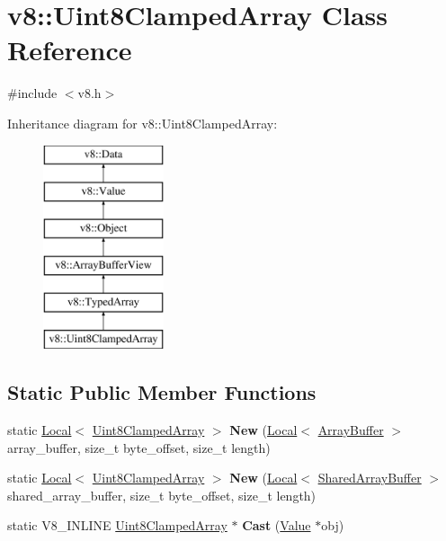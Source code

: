 \hypertarget{classv8_1_1_uint8_clamped_array}{}\section{v8\+:\+:Uint8\+Clamped\+Array Class Reference}
\label{classv8_1_1_uint8_clamped_array}


{\ttfamily \#include $<$v8.\+h$>$}

Inheritance diagram for v8\+:\+:Uint8\+Clamped\+Array\+:\begin{figure}[H]
\begin{center}
\leavevmode
\includegraphics[height=6.000000cm]{classv8_1_1_uint8_clamped_array}
\end{center}
\end{figure}
\subsection*{Static Public Member Functions}
\begin{DoxyCompactItemize}
\item 
static \hyperlink{classv8_1_1_local}{Local}$<$ \hyperlink{classv8_1_1_uint8_clamped_array}{Uint8\+Clamped\+Array} $>$ {\bfseries New} (\hyperlink{classv8_1_1_local}{Local}$<$ \hyperlink{classv8_1_1_array_buffer}{Array\+Buffer} $>$ array\+\_\+buffer, size\+\_\+t byte\+\_\+offset, size\+\_\+t length)\hypertarget{classv8_1_1_uint8_clamped_array_abadcd9c3c77b071e21f3140e0ed4411f}{}\label{classv8_1_1_uint8_clamped_array_abadcd9c3c77b071e21f3140e0ed4411f}

\item 
static \hyperlink{classv8_1_1_local}{Local}$<$ \hyperlink{classv8_1_1_uint8_clamped_array}{Uint8\+Clamped\+Array} $>$ {\bfseries New} (\hyperlink{classv8_1_1_local}{Local}$<$ \hyperlink{classv8_1_1_shared_array_buffer}{Shared\+Array\+Buffer} $>$ shared\+\_\+array\+\_\+buffer, size\+\_\+t byte\+\_\+offset, size\+\_\+t length)\hypertarget{classv8_1_1_uint8_clamped_array_a4f42e014ea0d35b33b6160bab223b4e3}{}\label{classv8_1_1_uint8_clamped_array_a4f42e014ea0d35b33b6160bab223b4e3}

\item 
static V8\+\_\+\+I\+N\+L\+I\+NE \hyperlink{classv8_1_1_uint8_clamped_array}{Uint8\+Clamped\+Array} $\ast$ {\bfseries Cast} (\hyperlink{classv8_1_1_value}{Value} $\ast$obj)\hypertarget{classv8_1_1_uint8_clamped_array_aa1358e0ac24e305af5c90ba71b73fa7c}{}\label{classv8_1_1_uint8_clamped_array_aa1358e0ac24e305af5c90ba71b73fa7c}

\end{DoxyCompactItemize}
